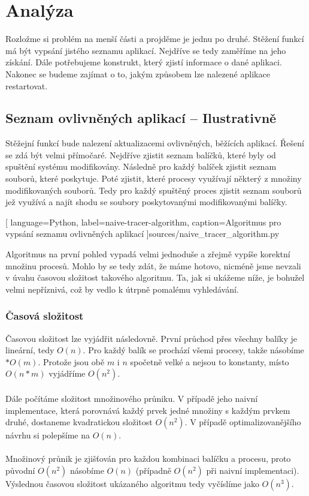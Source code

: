 \documentclass[10pt,a4paper]{article}
\begin{document}
	\section{Analýza}
	Rozložme si problém na menší části a projděme je jednu po druhé. Stěžení funkcí má být vypsání jistého seznamu aplikací. Nejdříve se tedy zaměříme na jeho získání. Dále potřebujeme konstrukt, který zjistí informace o  dané aplikaci. Nakonec se budeme zajímat o to, jakým způsobem lze nalezené aplikace restartovat.

		\subsection{Seznam ovlivněných aplikací -- Ilustrativně}
		Stěžejní funkcí bude nalezení aktualizacemi ovlivněných, běžících aplikací. Řešení se zdá být velmi přímočaré. Nejdříve zjistit seznam balíčků, které byly od spuštění systému modifikovány. Následně pro každý balíček zjistit seznam souborů, které poskytuje. Poté zjistit, které procesy využívají některý z množiny modifikovaných souborů. Tedy pro každý spuštěný proces zjistit seznam souborů jež využívá a najít shodu se soubory poskytovanými modifikovanými balíčky.

		
		[
			language={Python},
			label=naive-tracer-algorithm,
			caption={Algoritmus pro vypsání seznamu ovlivněných aplikací}
		]{sources/naive_tracer_algorithm.py}

		Algoritmus na první pohled vypadá velmi jednoduše a zřejmě vypíše korektní množinu procesů. Mohlo by se tedy zdát, že máme hotovo, nicméně jsme nevzali v úvahu časovou složitost takového algoritmu. Ta, jak si ukážeme níže, je bohužel velmi nepříznivá, což by vedlo k útrpně pomalému vyhledávání.

			\subsubsection*{Časová složitost}
			Časovou složitost lze vyjádřit následovně. První průchod přes všechny balíky je lineární, tedy $O(n)$. Pro každý balík se prochází všemi procesy, takže násobíme $* O(m)$. Protože jsou obě $m$ i $n$ spočetně velké a nejsou to konstanty, místo $O(n*m)$ vyjádříme $O(n^2)$.
			\\
			\\
			Dále počítáme složitost množinového průniku. V případě jeho naivní implementace, která porovnává každý prvek jedné množiny s každým prvkem druhé, dostaneme kvadratickou složitost $O(n^2)$. V případě optimalizovanějšího návrhu si polepšíme na $O(n)$.
			\\
			\\
			Množinový průnik je zjišťován pro každou kombinaci balíčku a procesu, proto původní $O(n^2)$ násobíme $O(n)$ (případně $O(n^2)$ při naivní implementaci). Výslednou časovou složitost ukázaného algoritmu tedy vyčíslíme jako $O(n^3)$.
\end{document}
